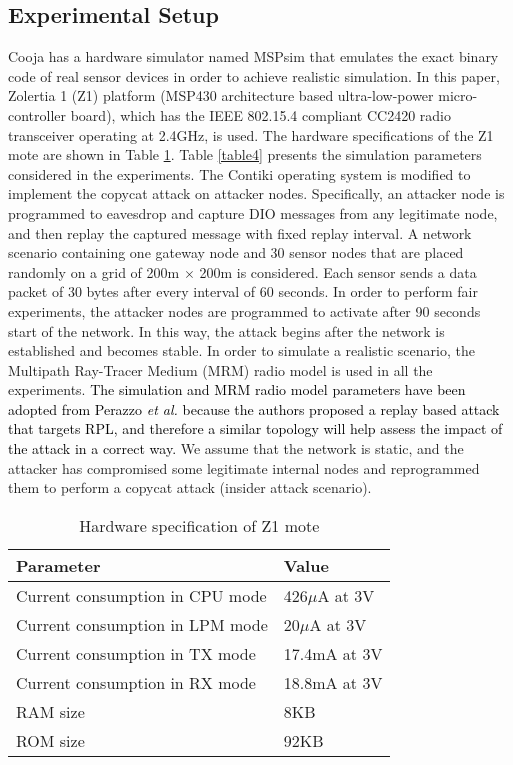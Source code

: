 \documentclass[]{svjour3}                     %
\begin{document}
\subsection{Experimental Setup}
Cooja has a hardware simulator named MSPsim that emulates the exact binary code of real sensor devices in order to achieve realistic simulation. In this paper, Zolertia 1 (Z1) platform (MSP430 architecture based ultra-low-power micro-controller board), which has the IEEE 802.15.4 compliant CC2420 radio transceiver operating at 2.4GHz, is used. The hardware specifications of the Z1 mote are shown in Table \ref{table3}. Table \ref{table4} presents the simulation parameters considered in the experiments. The Contiki operating system is modified to implement the copycat attack on attacker nodes. Specifically, an attacker node is programmed to eavesdrop and capture DIO messages from any legitimate node, and then replay the captured message with fixed replay interval. A network scenario containing one gateway node and 30 sensor nodes that are placed randomly on a grid of 200m $ \times $ 200m is considered. Each sensor sends a data packet of 30 bytes after every interval of 60 seconds. In order to perform fair experiments, the attacker nodes are programmed to activate after 90 seconds start of the network. In this way, the attack begins after the network is established and becomes stable. In order to simulate a realistic scenario, the Multipath Ray-Tracer Medium (MRM) radio model is used in all the experiments. \textcolor{black}{The simulation and MRM radio model parameters have been adopted from Perazzo \textit{et al.} \cite{Perazzo2017, vallatiemail} because the authors proposed a replay based attack that targets RPL, and therefore a similar topology will help assess the impact of the attack in a correct way.} We assume that the network is static, and the attacker has compromised some legitimate internal nodes and reprogrammed them to perform a copycat attack (insider attack scenario).      

\begin{table}[!h]
	\centering
	\caption{Hardware specification of Z1 mote \cite{advancare2010zolertia}}
	\begin{tabular}{|l|l|}
		\hline
		\textbf{Parameter} & \textbf{Value}\\ \hline
		Current consumption in CPU mode & 426$ \mu $A at 3V \\ \hline
		Current consumption in LPM mode & 20$ \mu $A  at 3V \\ \hline
		Current consumption in TX mode & 17.4mA at 3V\\ \hline
		Current consumption in RX mode& 18.8mA at 3V\\ \hline
		RAM size & 8KB \\ \hline
		ROM size & 92KB \\ \hline
		
		
	\end{tabular} 
	\label{table3}
\end{table}
\end{document}
